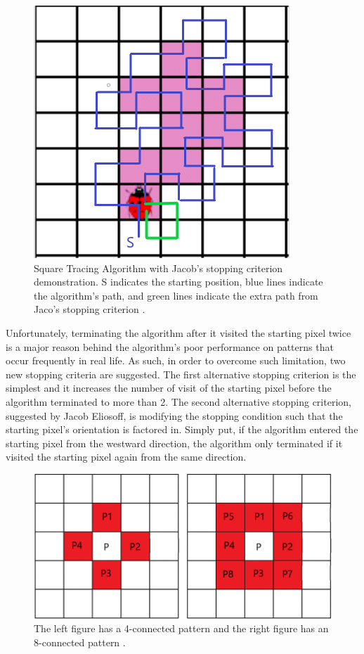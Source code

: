 \documentclass[conference]{IEEEtran}
\begin{document}
\begin{figure}[!htb]
    \centering
    \includegraphics[scale = 0.5]{fig2.png}
    \caption{Square Tracing Algorithm with Jacob's stopping criterion demonstration. S indicates the starting position, blue lines indicate the algorithm's path, and green lines indicate the extra path from Jaco's stopping criterion \cite{sta:2000}.}
\end{figure}

Unfortunately, terminating the algorithm after it visited the starting pixel twice is a major reason behind the algorithm's poor performance on patterns that occur frequently in real life. As such, in order to overcome such limitation, two new stopping criteria are suggested. The first alternative stopping criterion is the simplest and it increases the number of visit of the starting pixel before the algorithm terminated to more than 2. The second alternative stopping criterion, suggested by Jacob Eliosoff, is modifying the stopping condition such that the starting pixel's orientation is factored in. Simply put, if the algorithm entered the starting pixel from the westward direction, the algorithm only terminated if it visited the starting pixel again from the same direction.

\begin{figure}[!htb]
    \centering
    \includegraphics[scale = 0.3]{fig3.png}
    \caption{The left figure has a 4-connected pattern and the right figure has an 8-connected pattern \cite{gct:2010, dc:2000}.}
\end{figure}
\end{document}
